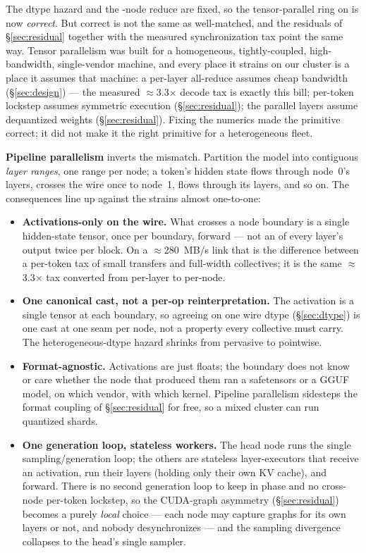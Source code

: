 \documentclass[11pt]{article}
\begin{document}
The dtype hazard and the -node reduce are fixed, so the tensor-parallel ring on  is now
\emph{correct}. But correct is not the same as well-matched, and the residuals of \S\ref{sec:residual}
together with the measured synchronization tax point the same way. Tensor parallelism was built for a
homogeneous, tightly-coupled, high-bandwidth, single-vendor machine, and every place it strains on our
cluster is a place it assumes that machine: a per-layer all-reduce assumes cheap bandwidth
(\S\ref{sec:design}) --- the measured $\approx$3.3$\times$ decode tax is exactly this bill; per-token
lockstep assumes symmetric execution (\S\ref{sec:residual}); the parallel layers assume dequantized
weights (\S\ref{sec:residual}). Fixing the numerics made the primitive correct; it did not make it the
right primitive for a heterogeneous fleet.

\textbf{Pipeline parallelism} inverts the mismatch. Partition the model into contiguous \emph{layer
ranges}, one range per node; a token's hidden state flows through node~0's layers, crosses the wire once
to node~1, flows through its layers, and so on. The consequences line up against the strains almost
one-to-one:

\begin{itemize}[leftmargin=1.4em,itemsep=2pt]
\item \textbf{Activations-only on the wire.} What crosses a node boundary is a single hidden-state tensor,
once per boundary, forward --- not an  of every layer's output twice per block. On a
$\approx$280~MB/s link that is the difference between a per-token tax of  small transfers and
 full-width collectives; it is the same $\approx$3.3$\times$ tax converted from
per-layer to per-node.
\item \textbf{One canonical cast, not a per-op reinterpretation.} The activation is a single tensor at
each boundary, so agreeing on one wire dtype (\S\ref{sec:dtype}) is one cast at one seam per node, not a
property every collective must carry. The heterogeneous-dtype hazard shrinks from pervasive to pointwise.
\item \textbf{Format-agnostic.} Activations are just floats; the boundary does not know or care whether the
node that produced them ran a safetensors or a GGUF model, on which vendor, with which kernel. Pipeline
parallelism sidesteps the format coupling of \S\ref{sec:residual} for free, so a mixed cluster can run
quantized shards.
\item \textbf{One generation loop, stateless workers.} The head node runs the single sampling/generation
loop; the others are stateless layer-executors that receive an activation, run their layers (holding only
their own KV cache), and forward. There is no second generation loop to keep in phase and no cross-node
per-token lockstep, so the CUDA-graph asymmetry (\S\ref{sec:residual}) becomes a purely \emph{local}
choice --- each node may capture graphs for its own layers or not, and nobody desynchronizes --- and the
sampling divergence collapses to the head's single sampler.
\end{itemize}
\end{document}
